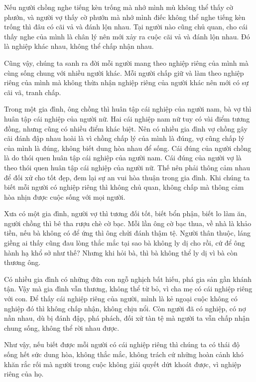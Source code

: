 \documentclass[
  12pt,
  oneside]{book}
\begin{document}
Nếu người chồng nghe tiếng kèn trống mà nhớ mình mù không thể thấy cờ phướn, và người vợ thấy cờ phướn mà nhớ mình điếc không thể nghe tiếng kèn trống thì đâu có cãi vả và đánh lộn nhau. Tại người nào cũng chủ quan, cho cái thấy nghe của mình là chân lý nên mới xảy ra cuộc cãi vả và đánh lộn nhau. Đó là nghiệp khác nhau, không thể chấp nhận nhau.

Cũng vậy, chúng ta sanh ra đời mỗi người mang theo nghiệp riêng của mình mà cùng sống chung với nhiều người khác. Mỗi người chấp giữ và làm theo nghiệp riêng của mình mà không thừa nhận nghiệp riêng của người khác nên mới có sự cãi vã, tranh chấp.

Trong một gia đình, ông chồng thì huân tập cái nghiệp của người nam, bà vợ thì huân tập cái nghiệp của người nữ. Hai cái nghiệp nam nữ tuy có vài điểm tương đồng, nhưng cũng có nhiều điểm khác biệt. Nên có nhiều gia đình vợ chồng gây cãi đánh đập nhau hoài là vì chồng chấp lý của mình là đúng, vợ cũng chấp lý của mình là đúng, không biết dung hòa nhau để sống. Cái đúng của người chồng là do thói quen huân tập cái nghiệp của người nam. Cái đúng của người vợ là theo thói quen huân tập cái nghiệp của người nữ. Thế nên phải thông cảm nhau để đối xử cho tốt đẹp, đem lại sự an vui hòa thuận trong gia đình. Khi chúng ta biết mỗi người có nghiệp riêng thì không chủ quan, không chấp mà thông cảm hòa nhịn được cuộc sống với mọi người.

Xưa có một gia đình, người vợ thì tương đối tốt, biết bổn phận, biết lo làm ăn, người chồng thì bê tha rượu chè cờ bạc. Mỗi lần ông cờ bạc thua, về nhà là khảo tiền, nếu bà không có để ứng thì ông chửi đánh thậm tệ. Người thân thuộc, láng giềng ai thấy cũng đau lòng thắc mắc tại sao bà không ly dị cho rồi, cứ để ông hành hạ khổ sở như thế? Nhưng khi hỏi bà, thì bà không thể ly dị vì bà còn thương ông.

Có nhiều gia đình có những đứa con ngỗ nghịch bất hiếu, phá gia sản gần khánh tận. Vậy mà gia đình vẫn thương, không thể từ bỏ, vì cha mẹ có cái nghiệp riêng với con. Để thấy cái nghiệp riêng của người, mình là kẻ ngoại cuộc không có nghiệp đó thì không chấp nhận, không chịu nổi. Còn người đã có nghiệp, có nợ nần nhau, dù bị đánh đập, phá phách, đối xử tàn tệ mà người ta vẫn chấp nhận chung sống, không thể rời nhau được.

Như vậy, nếu biết được mỗi người có cái nghiệp riêng thì chúng ta có thái độ sống hết sức dung hòa, không thắc mắc, không trách cứ những hoàn cảnh khó khăn rắc rối mà người trong cuộc không giải quyết dứt khoát được, vì nghiệp riêng của họ.
\end{document}
